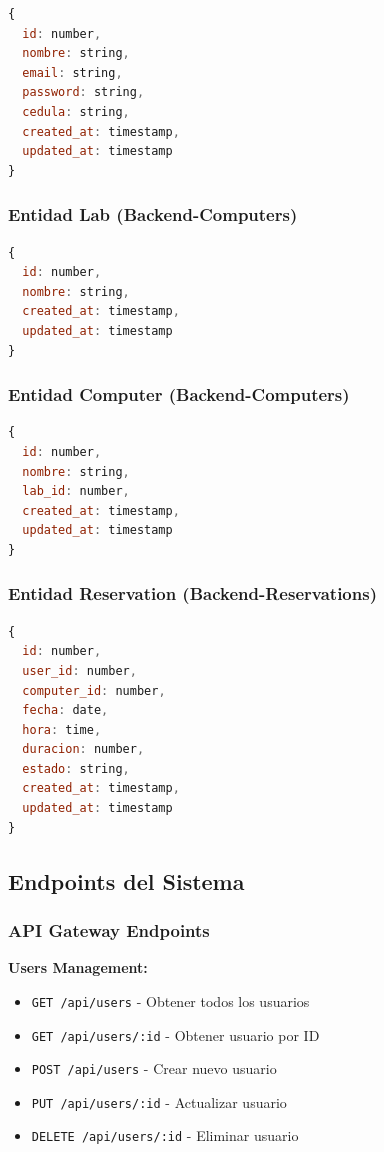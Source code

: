 \documentclass[12pt,a4paper]{article}
\begin{document}
\begin{lstlisting}[language=JavaScript, caption=Modelo de Usuario]
{
  id: number,
  nombre: string,
  email: string,
  password: string,
  cedula: string,
  created_at: timestamp,
  updated_at: timestamp
}
\end{lstlisting}

\subsubsection{Entidad Lab (Backend-Computers)}

\begin{lstlisting}[language=JavaScript, caption=Modelo de Laboratorio]
{
  id: number,
  nombre: string,
  created_at: timestamp,
  updated_at: timestamp
}
\end{lstlisting}

\subsubsection{Entidad Computer (Backend-Computers)}

\begin{lstlisting}[language=JavaScript, caption=Modelo de Computadora]
{
  id: number,
  nombre: string,
  lab_id: number,
  created_at: timestamp,
  updated_at: timestamp
}
\end{lstlisting}

\subsubsection{Entidad Reservation (Backend-Reservations)}

\begin{lstlisting}[language=JavaScript, caption=Modelo de Reserva]
{
  id: number,
  user_id: number,
  computer_id: number,
  fecha: date,
  hora: time,
  duracion: number,
  estado: string,
  created_at: timestamp,
  updated_at: timestamp
}
\end{lstlisting}

\subsection{Endpoints del Sistema}

\subsubsection{API Gateway Endpoints}

\textbf{Users Management:}
\begin{itemize}
    \item \texttt{GET /api/users} - Obtener todos los usuarios
    \item \texttt{GET /api/users/:id} - Obtener usuario por ID
    \item \texttt{POST /api/users} - Crear nuevo usuario
    \item \texttt{PUT /api/users/:id} - Actualizar usuario
    \item \texttt{DELETE /api/users/:id} - Eliminar usuario
\end{itemize}
\end{document}
